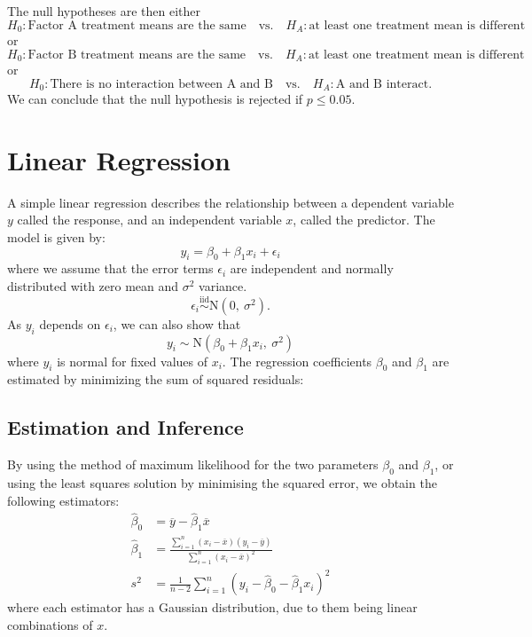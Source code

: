 \documentclass{article}
\begin{document}
The null hypotheses are then either
\begin{equation*}
    H_0 : \text{Factor A treatment means are the same} \quad \text{vs.} \quad H_A : \text{at least one treatment mean is different}
\end{equation*}
or
\begin{equation*}
    H_0 : \text{Factor B treatment means are the same} \quad \text{vs.} \quad H_A : \text{at least one treatment mean is different}
\end{equation*}
or
\begin{equation*}
    H_0 : \text{There is no interaction between A and B} \quad \text{vs.} \quad H_A : \text{A and B interact}.
\end{equation*}
We can conclude that the null hypothesis is rejected if \(p \leq 0.05\).
\section{Linear Regression}
A simple linear regression describes the relationship between a dependent variable \(y\)
called the response,
and an independent variable \(x\), called the predictor. The model is given by:
\begin{equation*}
    y_i = \beta_0 + \beta_1 x_i + \epsilon_i
\end{equation*}
where we assume that the error terms \(\epsilon_i\) are independent and normally distributed with zero mean and \(\sigma^2\) variance.
\begin{equation*}
    \epsilon_i \overset{\mathrm{iid}}{\sim} \mathrm{N}\left( 0,\: \sigma^2 \right).
\end{equation*}
As \(y_i\) depends on \(\epsilon_i\), we can also show that
\begin{equation*}
    y_i \sim \mathrm{N}\left( \beta_0 + \beta_1 x_i,\: \sigma^2 \right)
\end{equation*}
where \(y_i\) is normal for fixed values of \(x_i\).
The regression coefficients \(\beta_0\) and \(\beta_1\) are estimated by minimizing the sum of squared residuals:
\subsection{Estimation and Inference}
By using the method of maximum likelihood for the two parameters \(\beta_0\) and \(\beta_1\), or using the least squares solution by minimising the
squared error, we obtain the following estimators:
\begin{align*}
    \hat{\beta}_0 & = \overline{y} - \hat{\beta}_1 \overline{x}                                                                                                     \\
    \hat{\beta}_1 & = \frac{\sum_{i = 1}^n \left( x_i - \overline{x} \right) \left( y_i - \overline{y} \right)}{\sum_{i = 1}^n \left( x_i - \overline{x} \right)^2} \\
    s^2           & = \frac{1}{n - 2} \sum_{i = 1}^n \left( y_i - \hat{\beta}_0 - \hat{\beta}_1 x_i \right)^2
\end{align*}
where each estimator has a Gaussian distribution, due to them being linear combinations of \(x\).
\end{document}
